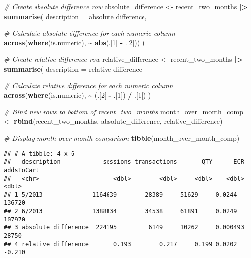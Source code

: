 \documentclass[
]{article}
\newenvironment{Shaded}{\begin{snugshade}}{\end{snugshade}}
\newcommand{\AttributeTok}[1]{\textcolor[rgb]{0.13,0.29,0.53}{#1}}
\newcommand{\CommentTok}[1]{\textcolor[rgb]{0.56,0.35,0.01}{\textit{#1}}}
\newcommand{\DecValTok}[1]{\textcolor[rgb]{0.00,0.00,0.81}{#1}}
\newcommand{\FunctionTok}[1]{\textcolor[rgb]{0.13,0.29,0.53}{\textbf{#1}}}
\newcommand{\NormalTok}[1]{#1}
\newcommand{\OtherTok}[1]{\textcolor[rgb]{0.56,0.35,0.01}{#1}}
\newcommand{\SpecialCharTok}[1]{\textcolor[rgb]{0.81,0.36,0.00}{\textbf{#1}}}
\newcommand{\StringTok}[1]{\textcolor[rgb]{0.31,0.60,0.02}{#1}}
\begin{document}
\begin{Shaded}
\begin{Highlighting}[]
\CommentTok{\# Create absolute difference row}
\NormalTok{absolute\_difference }\OtherTok{\textless{}{-}}\NormalTok{ recent\_two\_months }\SpecialCharTok{|\textgreater{}}
  \FunctionTok{summarise}\NormalTok{(}
    \AttributeTok{description =} \StringTok{\textquotesingle{}absolute difference\textquotesingle{}}\NormalTok{,}
    
    \CommentTok{\# Calculate absolute difference for each numeric column}
    \FunctionTok{across}\NormalTok{(}\FunctionTok{where}\NormalTok{(is.numeric), }\SpecialCharTok{\textasciitilde{}} \FunctionTok{abs}\NormalTok{(.[}\DecValTok{1}\NormalTok{] }\SpecialCharTok{{-}}\NormalTok{ .[}\DecValTok{2}\NormalTok{]))}
\NormalTok{  )}

\CommentTok{\# Create relative difference row}
\NormalTok{relative\_difference }\OtherTok{\textless{}{-}}\NormalTok{ recent\_two\_months }\SpecialCharTok{|\textgreater{}}
  \FunctionTok{summarise}\NormalTok{(}
    \AttributeTok{description =} \StringTok{\textquotesingle{}relative difference\textquotesingle{}}\NormalTok{,}
    
    \CommentTok{\# Calculate relative difference for each numeric column}
    \FunctionTok{across}\NormalTok{(}\FunctionTok{where}\NormalTok{(is.numeric), }\SpecialCharTok{\textasciitilde{}}\NormalTok{ (.[}\DecValTok{2}\NormalTok{] }\SpecialCharTok{{-}}\NormalTok{ .[}\DecValTok{1}\NormalTok{]) }\SpecialCharTok{/}\NormalTok{ .[}\DecValTok{1}\NormalTok{])}
\NormalTok{  )}

\CommentTok{\# Bind new rows to bottom of \textasciigrave{}recent\_two\_months\textasciigrave{}}
\NormalTok{month\_over\_month\_comp }\OtherTok{\textless{}{-}} \FunctionTok{rbind}\NormalTok{(recent\_two\_months, absolute\_difference, relative\_difference)}

\CommentTok{\# Display month over month comparison}
\FunctionTok{tibble}\NormalTok{(month\_over\_month\_comp)}
\end{Highlighting}
\end{Shaded}

\begin{verbatim}
## # A tibble: 4 x 6
##   description            sessions transactions       QTY      ECR addsToCart
##   <chr>                     <dbl>        <dbl>     <dbl>    <dbl>      <dbl>
## 1 5/2013              1164639        28389     51629     0.0244   136720    
## 2 6/2013              1388834        34538     61891     0.0249   107970    
## 3 absolute difference  224195         6149     10262     0.000493  28750    
## 4 relative difference       0.193        0.217     0.199 0.0202       -0.210
\end{verbatim}
\end{document}
